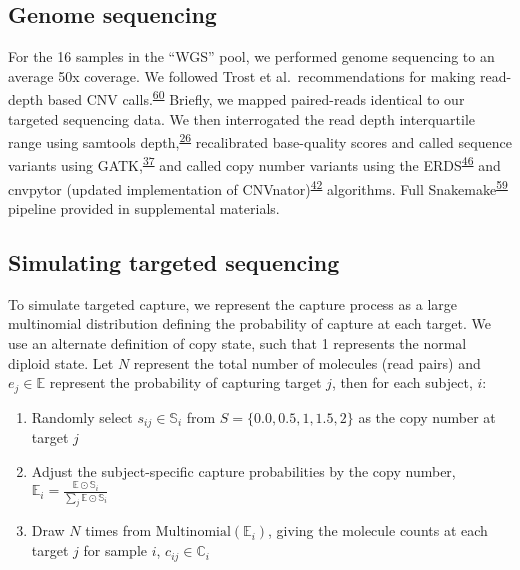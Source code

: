 \documentclass[11pt,letterpaper]{book}
\begin{document}
\hypertarget{genome-sequencing}{%
\subsection{Genome sequencing}\label{genome-sequencing}}

For the 16 samples in the ``WGS'' pool, we performed genome sequencing to an average 50x coverage.
We followed Trost et al.~recommendations for making read-depth based CNV calls.\textsuperscript{\protect\hyperlink{ref-trost:2018aa}{60}}
Briefly, we mapped paired-reads identical to our targeted sequencing data.
We then interrogated the read depth interquartile range using samtools depth,\textsuperscript{\protect\hyperlink{ref-li:2009aa}{26}} recalibrated base-quality scores and called sequence variants using GATK,\textsuperscript{\protect\hyperlink{ref-van-der-auwera:2013aa}{37}} and called copy number variants using the ERDS\textsuperscript{\protect\hyperlink{ref-zhu:2012aa}{46}} and cnvpytor (updated implementation of CNVnator)\textsuperscript{\protect\hyperlink{ref-abyzov:2011aa}{42}} algorithms.
Full Snakemake\textsuperscript{\protect\hyperlink{ref-koster:2012aa}{59}} pipeline provided in supplemental materials.

\hypertarget{simulating-targeted-sequencing}{%
\subsection{Simulating targeted sequencing}\label{simulating-targeted-sequencing}}

To simulate targeted capture, we represent the capture process as a large multinomial distribution defining the probability of capture at each target.
We use an alternate definition of copy state, such that 1 represents the normal diploid state.
Let \(N\) represent the total number of molecules (read pairs) and \(e_j \in \mathbb{E}\) represent the probability of capturing target \(j\), then for each subject, \(i\):

\begin{enumerate}
\def\labelenumi{\arabic{enumi}.}
\item
  Randomly select \(s_{ij} \in \mathbb{S}_i\) from \(S = \{0.0, 0.5, 1, 1.5, 2\}\) as the copy number at target \(j\)
\item
  Adjust the subject-specific capture probabilities by the copy number, \(\mathbb{E}_i = \frac{\mathbb{E} \odot \mathbb{S}_{i}}{\sum_j \mathbb{E} \odot \mathbb{S}_{i}}\)
\item
  Draw \(N\) times from \(\text{Multinomial}(\mathbb{E}_i)\), giving the molecule counts at each target \(j\) for sample \(i\), \(c_{ij} \in \mathbb{C}_i\)
\end{enumerate}
\end{document}
